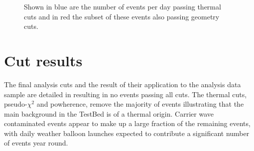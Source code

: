 \begin{figure}[htpb]
\hfill
{}
\caption{Shown in blue are the number of events per day passing thermal cuts and in red the subset of these events also passing geometry cuts.}
\label{fig:Analysis:Anthropogenic-Cuts:GoodTimes:Event-Rate}
\end{figure}

\section{Cut results}
\label{sec:Analysis:Cut-Results}

The final analysis cuts and the result of their application to the analysis data sample are detailed in  resulting in no events passing all cuts. The thermal cuts, pseudo-$\chi^{2}$ and powherence, remove the majority of events illustrating that the main background in the TestBed is of a thermal origin. Carrier wave contaminated events appear to make up a large fraction of the remaining events, with daily weather balloon launches expected to contribute a significant number of events year round. 

